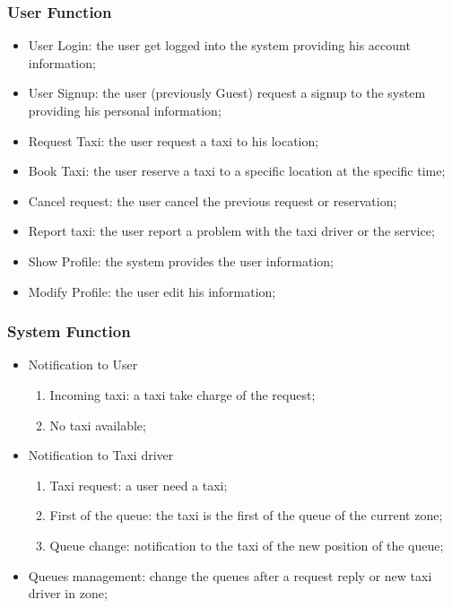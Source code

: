 \documentclass[english]{article}
\begin{document}
\subsubsection{User Function}
\begin{itemize}
	\item User Login: the user get logged into the system providing his account information;
	\item User Signup: the user (previously Guest) request a signup to the system providing his personal information;
	\item Request Taxi: the user request a taxi to his location;
	\item Book Taxi: the user reserve a taxi to a specific location at the specific time;
	\item Cancel request: the user cancel the previous request or reservation;
	\item Report taxi: the user report a problem with the taxi driver or the service;
	\item Show Profile: the system provides the user information;
	\item Modify Profile: the user edit his information;
\end{itemize}

\subsubsection{System Function}
\begin{itemize}
	\item Notification to User
	\begin{enumerate}
		\item Incoming taxi: a taxi take charge of the request;
		\item No taxi available;
	\end{enumerate}
	\item Notification to Taxi driver
	\begin{enumerate}
		\item Taxi request: a user need a taxi;
		\item First of the queue: the taxi is the first of the queue of the current zone;
		\item Queue change: notification to the taxi of the new position of the queue;
	\end{enumerate}
	\item Queues management: change the queues after a request reply or new taxi driver in zone;
\end{itemize}
\end{document}
